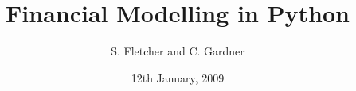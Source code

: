 \documentclass{book}
\title{Financial Modelling in Python}
\author{S. Fletcher and C. Gardner}
\date{12th January, 2009}
\begin{document}
  \frontmatter
  
  
  \mainmatter
  
  
  
  
  
  
  
  
  
  
  
  
  \begin{appendices}
    
    
    
    
  \end{appendices}
  
  \backmatter
  \printindex
\end{document}
